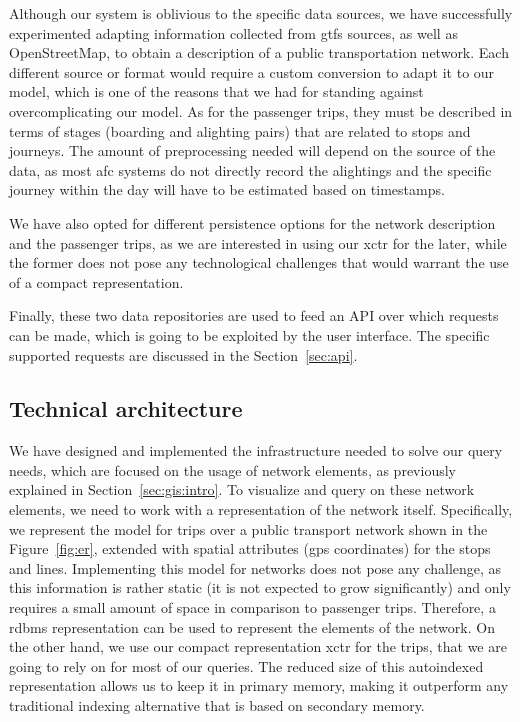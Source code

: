 	Although our system is oblivious to the specific data sources, we have successfully experimented adapting information collected from \gls{gtfs} sources, as well as OpenStreetMap, to obtain a description of a public transportation network. Each different source or format would require a custom conversion to adapt it to our model, which is one of the reasons that we had for standing against overcomplicating our model. As for the passenger trips, they must be described in terms of stages (boarding and alighting pairs) that are related to stops and journeys. The amount of preprocessing needed will depend on the source of the data, as most \gls{afc} systems do not directly record the alightings and the specific journey within the day will have to be estimated based on timestamps.
	
	We have also opted for different persistence options for the network description and the passenger trips, as we are interested in using our \gls{xctr} for the later, while the former does not pose any technological challenges that would warrant the use of a compact representation.
	
	Finally, these two data repositories are used to feed an API over which requests can be made, which is going to be exploited by the user interface. The specific supported requests are discussed in the Section~\ref{sec:api}.
	
	\subsection{Technical architecture}
	We have designed and implemented the infrastructure needed to solve our query needs, which are focused on the usage of network elements, as previously explained in Section~\ref{sec:gis:intro}. 
	To visualize and query on these network elements, we need to work with a representation of the network itself. Specifically, we represent the model for trips over a public transport network shown in the Figure~\ref{fig:er}, extended with spatial attributes (gps coordinates) for the stops and lines. Implementing this model for networks does not pose any challenge, as this information is rather static (it is not expected to grow significantly) and only requires a small amount of space in comparison to passenger trips. Therefore, a \gls{rdbms} representation can be used  to represent the elements of the network. On the other hand, we use our compact representation \gls{xctr} for the trips, that we are going to rely on for most of our queries. The reduced size of this autoindexed representation allows us to keep it in primary memory, making it outperform any traditional indexing alternative that is based on secondary memory.

